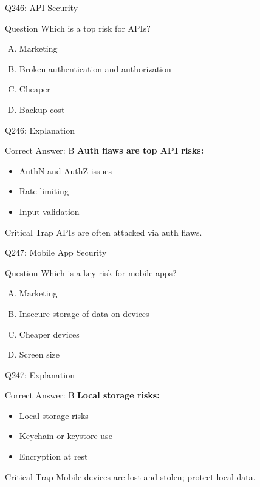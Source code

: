 \documentclass{beamer}
\begin{document}
	\begin{frame}{Q246: API Security}
		\begin{block}{Question}
			Which is a top risk for APIs?
		\end{block}
		\begin{enumerate}[(A)]
			\item Marketing
			\item Broken authentication and authorization
			\item Cheaper
			\item Backup cost
		\end{enumerate}
	\end{frame}
	
	\begin{frame}{Q246: Explanation}
		\begin{block}{Correct Answer: B}
			\textbf{Auth flaws are top API risks:}
			\begin{itemize}
				\item AuthN and AuthZ issues
				\item Rate limiting
				\item Input validation
			\end{itemize}
		\end{block}
		\begin{alertblock}{Critical Trap}
			APIs are often attacked via auth flaws.
		\end{alertblock}
	\end{frame}
	
	\begin{frame}{Q247: Mobile App Security}
		\begin{block}{Question}
			Which is a key risk for mobile apps?
		\end{block}
		\begin{enumerate}[(A)]
			\item Marketing
			\item Insecure storage of data on devices
			\item Cheaper devices
			\item Screen size
		\end{enumerate}
	\end{frame}
	
	\begin{frame}{Q247: Explanation}
		\begin{block}{Correct Answer: B}
			\textbf{Local storage risks:}
			\begin{itemize}
				\item Local storage risks
				\item Keychain or keystore use
				\item Encryption at rest
			\end{itemize}
		\end{block}
		\begin{alertblock}{Critical Trap}
			Mobile devices are lost and stolen; protect local data.
		\end{alertblock}
	\end{frame}
	
\end{document}
